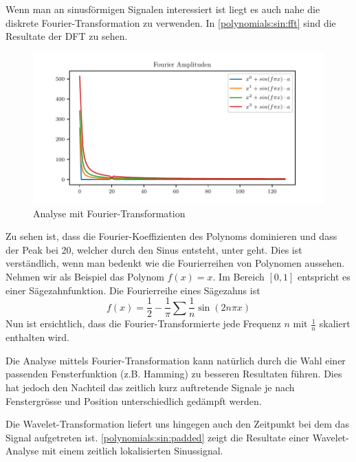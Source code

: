 \begin{refsection}
Wenn man an sinusförmigen Signalen interessiert ist liegt es auch nahe die
diskrete Fourier-Transformation zu verwenden. In \autoref{polynomials:sin:fft}
sind die Resultate der DFT zu sehen.

\begin{figure}
    \centering
    \includegraphics{papers/polynomials/images/polynomials_sin_fft.pdf}
    \caption{Analyse mit Fourier-Transformation\label{polynomials:sin:fft}}
\end{figure}

Zu sehen ist, dass die Fourier-Koeffizienten des Polynoms dominieren und dass
der Peak bei 20, welcher durch den Sinus entsteht, unter geht. Dies ist
verständlich, wenn man bedenkt wie die Fourierreihen von Polynomen aussehen.
Nehmen wir als Beispiel das Polynom $f(x) = x$. Im Bereich $[0, 1]$ entspricht
es einer Sägezahnfunktion. Die Fourierreihe eines Sägezahns ist \[f(x) =
\frac{1}{2} - \frac{1}{\pi} \sum{\frac{1}{n} \sin(2 n \pi x)}\] Nun ist
ersichtlich, dass die Fourier-Transformierte jede Frequenz $n$ mit $\frac{1}{n}$
skaliert enthalten wird.

Die Analyse mittels Fourier-Transformation kann natürlich durch die Wahl einer
passenden Fensterfunktion (z.B. Hamming) zu besseren Resultaten führen. Dies
hat jedoch den Nachteil das zeitlich kurz auftretende Signale je nach
Fenstergrösse und Position unterschiedlich gedämpft werden.

Die Wavelet-Transformation liefert uns hingegen auch den Zeitpunkt bei dem das
Signal aufgetreten ist. \autoref{polynomials:sin:padded} zeigt die Resultate
einer Wavelet-Analyse mit einem zeitlich lokalisierten Sinussignal.


\end{refsection}
